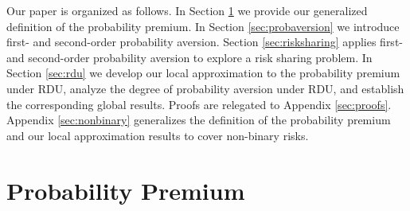 \documentclass[11pt]{article}
\begin{document}
Our paper is organized as follows.
In Section \ref{sec:probpremium} we provide our generalized definition of the probability premium.
In Section \ref{sec:probaversion} we introduce first- and second-order probability aversion.
Section \ref{sec:risksharing} applies first- and second-order probability aversion to explore a risk sharing problem.
In Section \ref{sec:rdu} we develop our local approximation to the probability premium under RDU,
analyze the degree of probability aversion under RDU,
and establish the corresponding global results.
Proofs are relegated to Appendix \ref{sec:proofs}.
Appendix \ref{sec:nonbinary} generalizes the definition of the probability premium
and our local approximation results to cover non-binary risks.


\setcounter{equation}{0}

\section{Probability Premium}\label{sec:probpremium}
\end{document}
